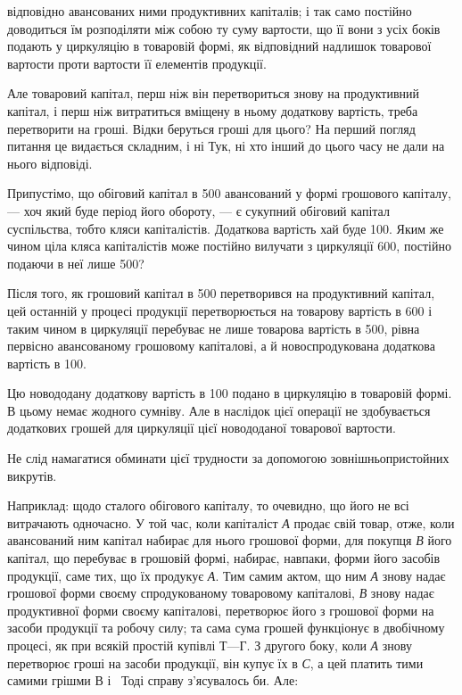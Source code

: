\parcont{}  %
відповідно авансованих ними продуктивних капіталів; і так само постійно
доводиться їм розподіляти між собою ту суму вартости, що її вони
з усіх боків подають у циркуляцію в товаровій формі, як відповідний
надлишок товарової вартости проти вартости її елементів продукції.

Але товаровий капітал, перш ніж він перетвориться знову на продуктивний
капітал, і перш ніж витратиться вміщену в ньому додаткову
вартість, треба перетворити на гроші. Відки беруться гроші для цього?
На перший погляд питання це видається складним, і ні Тук, ні хто інший
до цього часу не дали на нього відповіді.

Припустімо, що обіговий капітал в 500 авансований у формі
грошового капіталу, — хоч який буде період його обороту, — є сукупний
обіговий капітал суспільства, тобто кляси капіталістів. Додаткова вартість
хай буде 100. Яким же чином ціла кляса капіталістів може постійно
вилучати з циркуляції 600, постійно подаючи в неї
лише 500?

Після того, як грошовий капітал в 500 перетворився на
продуктивний капітал, цей останній у процесі продукції перетворюється
на товарову вартість в 600 і таким чином в циркуляції перебуває
не лише товарова вартість в 500, рівна первісно авансованому
грошовому капіталові, а й новоспродукована додаткова
вартість в 100.

Цю новододану додаткову вартість в 100 подано в циркуляцію
в товаровій формі. В цьому немає жодного сумніву. Але в наслідок
цієї операції не здобувається додаткових грошей для циркуляції
цієї новододаної товарової вартости.

Не слід намагатися обминати цієї трудности за допомогою зовнішньопристойних
викрутів.

Наприклад: щодо сталого обігового капіталу, то очевидно, що його
не всі витрачають одночасно. У той час, коли капіталіст \emph{А} продає
свій товар, отже, коли авансований ним капітал набирає для нього грошової
форми, для покупця \emph{В} його капітал, що перебуває в грошовій
формі, набирає, навпаки, форми його засобів продукції, саме тих, що їх
продукує \emph{А}. Тим самим актом, що ним \emph{А} знову надає грошової форми
своєму спродукованому товаровому капіталові, \emph{В} знову надає продуктивної
форми своєму капіталові, перетворює його з грошової форми на засоби
продукції та робочу силу; та сама сума грошей функціонує в двобічному
процесі, як при всякій простій купівлі $Т — Г$. З другого боку, коли
\emph{А} знову перетворює гроші на засоби продукції, він купує їх в \emph{С}, а
цей платить тими самими грішми В і~ Тоді справу з’ясувалось би. Але:

